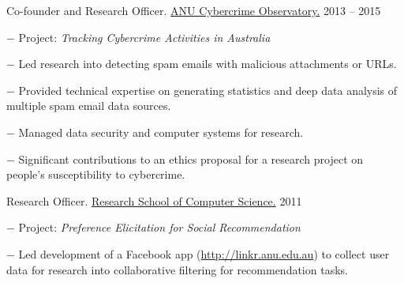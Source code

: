 \documentclass[10pt]{article}
\newcommand{\halfblankline}{\quad\vspace{-0.5\baselineskip}\pagebreak[3]}
\begin{document}
\begin{outerlist}
	\item Co-founder and Research Officer. \href{http://sociology.cass.anu.edu.au/centres/anu-cybercrime}{ANU Cybercrime Observatory.} \hfill {2013 -- 2015}
	\begin{innerlist}
		\item[$-$] Project: \textit{Tracking Cybercrime Activities in Australia}
		\item[$-$] Led research into detecting spam emails with malicious attachments or URLs.
		\item[$-$] Provided technical expertise on generating statistics and deep data analysis of multiple spam email data sources.
		\item[$-$] Managed data security and computer systems for research.
		\item[$-$] Significant contributions to an ethics proposal for a research project on people's susceptibility to cybercrime.
    \end{innerlist}
	
	\halfblankline
	
	\item Research Officer. \href{http://cs.anu.edu.au/}{Research School of Computer Science.} \hfill {2011}
	\begin{innerlist}
		\item[$-$] Project: \textit{Preference Elicitation for Social Recommendation}
		\item[$-$] Led development of a Facebook app (\href{http://linkr.anu.edu.au}{http://linkr.anu.edu.au}) to collect user data for research into collaborative filtering for recommendation tasks.
	\end{innerlist}
\end{outerlist}
\end{document}
